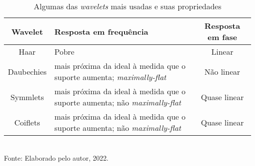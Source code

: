 \begin{table}[h]
	\centering
	\caption{Algumas das \textit{wavelets} mais usadas e suas propriedades}
	\begin{tabular}{|c|p{75mm}|c|}
			\hline 
			\textbf{Wavelet} & \textbf{Resposta em frequência} & \textbf{Resposta em fase} \\ 
			\hline 
			Haar & Pobre &  Linear \\ 
			\hline 
			Daubechies & mais próxima da ideal à medida que o \newline  suporte aumenta; \textit{maximally-flat}  &  Não linear \\ 
			\hline 
			Symmlets & mais próxima da ideal à medida que o \newline  suporte aumenta; não \textit{maximally-flat}  & Quase linear \\ 
			\hline 
			Coiflets & mais próxima da ideal à medida que o \newline  suporte aumenta; não \textit{maximally-flat}  & Quase linear \\ 
			\hline 
	\end{tabular} 
	\label{tab:waveletsProperties}
	\\Fonte: Elaborado pelo autor, 2022.
\end{table}
